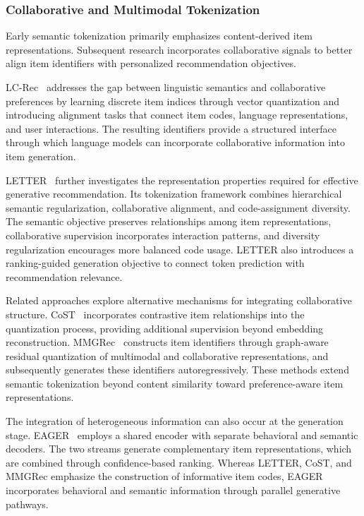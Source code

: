 \documentclass[sigconf,nonacm]{acmart}
\begin{document}
\subsubsection{Collaborative and Multimodal Tokenization}

Early semantic tokenization primarily emphasizes
content-derived item representations. Subsequent
research incorporates collaborative signals to
better align item identifiers with personalized
recommendation objectives.

LC-Rec~\cite{lcrec} addresses the gap between
linguistic semantics and collaborative preferences
by learning discrete item indices through vector
quantization and introducing alignment tasks that
connect item codes, language representations, and
user interactions. The resulting identifiers provide
a structured interface through which language models
can incorporate collaborative information into
item generation.

LETTER~\cite{letter} further investigates the
representation properties required for effective
generative recommendation. Its tokenization framework
combines hierarchical semantic regularization,
collaborative alignment, and code-assignment diversity.
The semantic objective preserves relationships among
item representations, collaborative supervision
incorporates interaction patterns, and diversity
regularization encourages more balanced code usage.
LETTER also introduces a ranking-guided generation
objective to connect token prediction with
recommendation relevance.

Related approaches explore alternative mechanisms
for integrating collaborative structure.
CoST~\cite{cost} incorporates contrastive item
relationships into the quantization process,
providing additional supervision beyond embedding
reconstruction. MMGRec~\cite{mmgrec} constructs
item identifiers through graph-aware residual
quantization of multimodal and collaborative
representations, and subsequently generates these
identifiers autoregressively. These methods extend
semantic tokenization beyond content similarity
toward preference-aware item representations.

The integration of heterogeneous information can
also occur at the generation stage. EAGER~\cite{eager}
employs a shared encoder with separate behavioral
and semantic decoders. The two streams generate
complementary item representations, which are
combined through confidence-based ranking. Whereas
LETTER, CoST, and MMGRec emphasize the construction
of informative item codes, EAGER incorporates
behavioral and semantic information through
parallel generative pathways.
\end{document}
